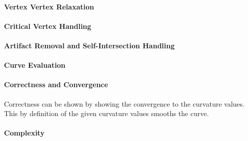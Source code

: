 \documentclass{stdlocal}
\begin{document}
  \paragraph{Vertex Vertex Relaxation}
  \paragraph{Critical Vertex Handling}
  \paragraph{Artifact Removal and Self-Intersection Handling}
  \paragraph{Curve Evaluation}
  \paragraph{Correctness and Convergence}
    Correctness can be shown by showing the convergence to the curvature values.
    This by definition of the given curvature values smooths the curve.
  \paragraph{Complexity}

\end{document}
